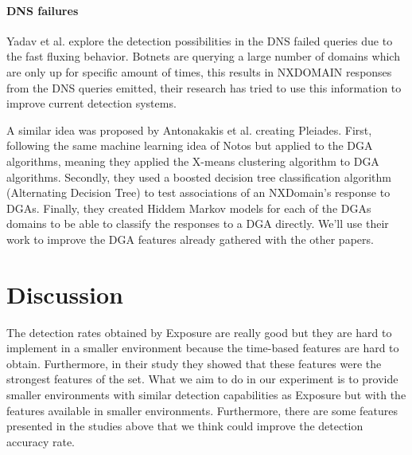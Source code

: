 \paragraph{DNS failures}
Yadav et al. \cite{dnsfailure} explore the detection possibilities in the DNS failed queries due to the fast fluxing behavior. Botnets are querying a large number of domains which are only up for specific amount of times, this results in NXDOMAIN responses from the DNS queries emitted, their research has tried to use this information to improve current detection systems.

A similar idea was proposed by Antonakakis et al. \cite{pleiades} creating Pleiades. First, following the same machine learning idea of Notos but applied to the DGA algorithms, meaning they applied the X-means clustering algorithm to DGA algorithms. Secondly, they used a boosted decision tree classification algorithm (Alternating Decision Tree) to test associations of an NXDomain's response to  DGAs. Finally, they created Hiddem Markov models for each of the DGAs domains to be able to classify the responses to a DGA directly. We'll use their work to improve the DGA features already gathered with the other papers.




\section{Discussion}
The detection rates obtained by Exposure are really good but they are hard to implement in a smaller environment because the time-based features are hard to obtain. Furthermore, in their study they showed that these features were the strongest features of the set. What we aim to do in our experiment is to provide smaller environments with similar detection capabilities as Exposure but with the features available in smaller environments. Furthermore, there are some features presented in the studies above that we think could improve the detection accuracy rate.

